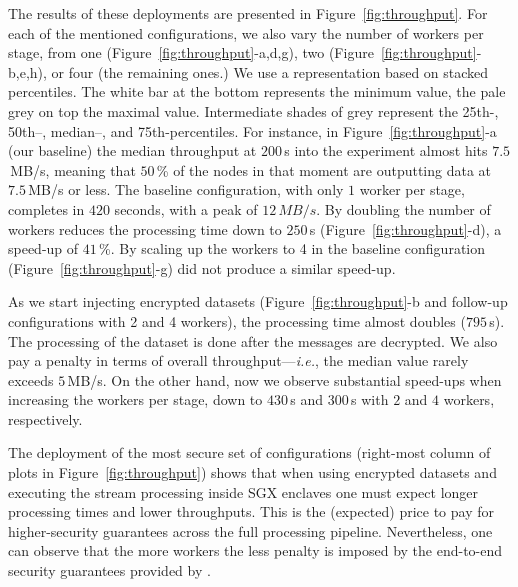 The results of these deployments are presented in Figure~\ref{fig:throughput}.
For each of the mentioned configurations, we also vary the number of workers per stage, from one (Figure~\ref{fig:throughput}-a,d,g), two (Figure~\ref{fig:throughput}-b,e,h), or four (the remaining ones.)
We use a representation based on stacked percentiles.
The white bar at the bottom represents the minimum value, the pale grey on top the maximal value.
Intermediate shades of grey represent the 25th-, 50th–, median–, and 75th-percentiles.
For instance, in Figure~\ref{fig:throughput}-a (our baseline) the median throughput at $200$\,s into the experiment almost hits $7.5$\,MB/s, meaning that $50$\,\% of the nodes in that moment are outputting data at $7.5$\,MB/s or less.
The baseline configuration, with only $1$ worker per stage, completes in $420$ seconds, with a peak of $12\,MB/s$.
By doubling the number of workers reduces the processing time down to $250$\,s (Figure~\ref{fig:throughput}-d), a speed-up of $41$\,\%.
By scaling up the workers to 4 in the baseline configuration (Figure~\ref{fig:throughput}-g) did not produce a similar speed-up.

As we start injecting encrypted datasets (Figure~\ref{fig:throughput}-b and follow-up configurations with 2 and 4 workers), the processing time almost doubles ($795$\,s).
The processing of the dataset is done after the messages are decrypted.
We also pay a penalty in terms of overall throughput---\emph{i.e.}, the median value rarely exceeds $5$\,MB/s.
On the other hand, now we observe substantial speed-ups when increasing the workers per stage, down to $430$\,s and $300$\,s with $2$ and $4$ workers, respectively.

The deployment of the most secure set of configurations (right-most column of plots in Figure~\ref{fig:throughput}) shows that when using encrypted datasets and executing the stream processing inside SGX enclaves one must expect longer processing times and lower throughputs.
This is the (expected) price to pay for higher-security guarantees across the full processing pipeline.
Nevertheless, one can observe that the more workers the less penalty is imposed by the end-to-end security guarantees provided by \SYS{}.

